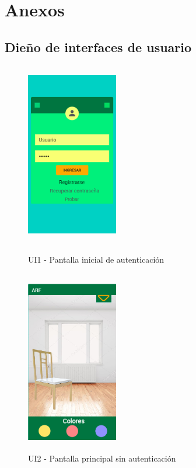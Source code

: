 \chapter{Anexos}

\section{Dieño de interfaces de usuario}
\begin{figure}[h!]
	\begin{minipage}{0.48\textwidth}
		\centering
		\includegraphics[width=4cm,height=8cm]{imagenes/Anexos/Mockup/1-Login.png}
		\caption{UI1 - Pantalla inicial de autenticación}
		\label{fig:analogo}
	\end{minipage}\hfill
	\begin{minipage}{0.48\textwidth}
		\centering
		\includegraphics[width=4cm,height=8cm]{imagenes/Anexos/Mockup/2-principalSinLogin.png}
		\caption{UI2 - Pantalla principal sin autenticación}
		\label{fig:analogo}
	\end{minipage}\hfill
\end{figure}

